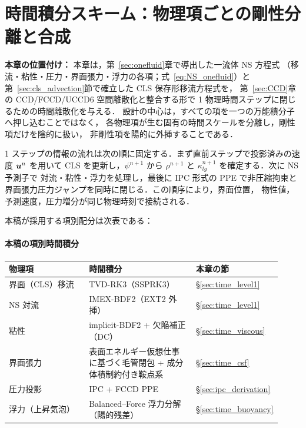 \section{時間積分スキーム：物理項ごとの剛性分離と合成}
\label{ch:time_integration}
\label{sec:time_int}

\noindent\textbf{本章の位置付け：}
本章は，第~\ref{sec:onefluid}章で導出した一流体 NS 方程式
（移流・粘性・圧力・界面張力・浮力の各項；式~\eqref{eq:NS_onefluid}）と
第~\ref{sec:cls_advection}節で確立した CLS 保存形移流方程式を，
第~\ref{sec:CCD}章の CCD/FCCD/UCCD6 空間離散化と整合する形で
1 物理時間ステップに閉じるための時間離散化を与える．
設計の中心は，すべての項を一つの万能積分子へ押し込むことではなく，
各物理項が生む固有の時間スケールを分離し，剛性項だけを陰的に扱い，
非剛性項を陽的に外挿することである．

1 ステップの情報の流れは次の順に固定する．まず直前ステップで投影済みの速度
$\bm{u}^n$ を用いて CLS を更新し，$\psi^{n+1}$ から
$\rho^{n+1}$ と $\kappa_{lg}^{n+1}$ を確定する．次に NS 予測子で
対流・粘性・浮力を処理し，最後に IPC 形式の PPE で非圧縮拘束と
界面張力圧力ジャンプを同時に閉じる．この順序により，界面位置，
物性値，予測速度，圧力増分が同じ物理時刻で接続される．

本稿が採用する項別配分は次表である：

\paragraph{本稿の項別時間積分}
\begin{center}
\small
\renewcommand{\arraystretch}{\PaperTableArrayStretch}
\begin{tabular}{@{}p{0.30\linewidth}p{0.40\linewidth}p{0.22\linewidth}@{}}
\hline
物理項 & 時間積分 & 本章の節 \\
\hline
界面（CLS）移流 & TVD-RK3（SSPRK3） & §\ref{sec:time_level1} \\
NS 対流 & IMEX-BDF2（EXT2 外挿） & §\ref{sec:time_level1} \\
粘性 & implicit-BDF2 + 欠陥補正（DC） & §\ref{sec:time_viscous} \\
界面張力 & 表面エネルギー仮想仕事に基づく毛管閉包 + 成分体積制約付き鞍点系 & §\ref{sec:time_csf} \\
圧力投影 & IPC + FCCD PPE & §\ref{sec:ipc_derivation} \\
浮力（上昇気泡） & Balanced--Force 浮力分解（陽的残差） & §\ref{sec:time_buoyancy} \\
\hline
\end{tabular}
\end{center}

